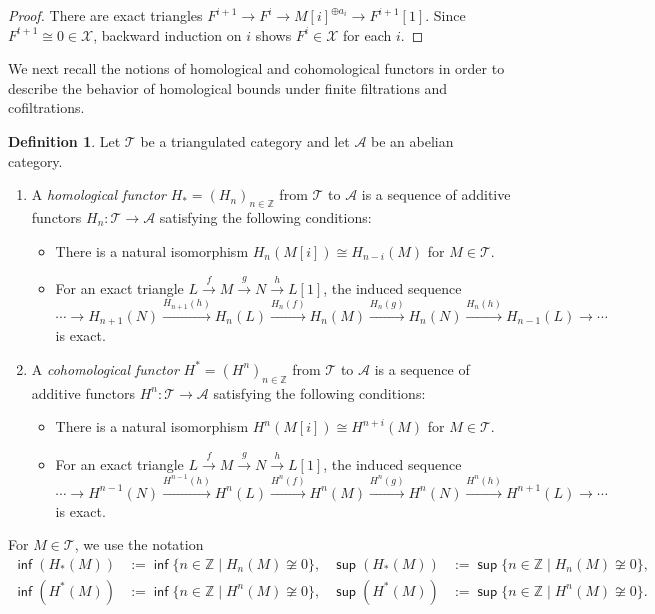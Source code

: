 \documentclass[10pt, a4paper,reqno]{amsart}
\theoremstyle{definition}
\newtheorem{dfn}[dfn]{Definition}
\theoremstyle{remark}
\numberwithin{equation}{thm}
\def\ZZ{\mathbb{Z}}
\def\cA{\mathcal{A}}
\def\cT{\mathcal{T}}
\def\cX{\mathcal{X}}
\def\sup{\operatorname{\mathsf{sup}}}
\def\inf{\operatorname{\mathsf{inf}}}
\begin{document}
\begin{proof}
There are exact triangles $F^{i+1} \to F^i \to M[i]^{\oplus a_i} \to F^{i+1}[1]$.
Since $F^{t+1} \cong 0 \in \cX$, backward induction on $i$ shows $F^i \in \cX$ for each $i$. 
\end{proof}


We next recall the notions of homological and cohomological functors in order to describe the behavior of homological bounds under finite filtrations and cofiltrations.

\begin{dfn}
Let $\cT$ be a triangulated category and let $\cA$ be an abelian category.
\begin{enumerate}[\rm(1)]
\item
A {\em homological functor}	$H_* = (H_n)_{n \in \ZZ}$ from $\cT$ to $\cA$ is a sequence of additive functors $H_n: \cT \to \cA$ satisfying the following conditions:
\begin{itemize}
\item
There is a natural isomorphism $H_{n}(M[i]) \cong H_{n-i}(M)$ for $M \in \cT$.
\item
For an exact triangle $L \xrightarrow{f} M \xrightarrow{g} N \xrightarrow{h} L[1]$, the induced sequence
\[
\cdots \to H_{n+1}(N) \xrightarrow{H_{n+1}(h)} H_n(L) \xrightarrow{H_{n}(f)} H_n(M) \xrightarrow{H_{n}(g)}  H_n(N) \xrightarrow{H_{n}(h)} H_{n-1}(L) \to \cdots 
\]
is exact.	
\end{itemize}

\item
A {\em cohomological functor} $H^* = (H^n)_{n \in \ZZ}$ from $\cT$ to $\cA$ is a sequence of additive functors $H^n: \cT \to \cA$ satisfying the following conditions:
\begin{itemize}
\item
There is a natural isomorphism $H^{n}(M[i]) \cong H^{n+i}(M)$ for $M \in \cT$.
\item
For an exact triangle $L \xrightarrow{f} M \xrightarrow{g} N \xrightarrow{h} L[1]$, the induced sequence
\[
\cdots \to H^{n-1}(N) \xrightarrow{H^{n-1}(h)} H^n(L) \xrightarrow{H^{n}(f)} H^n(M) \xrightarrow{H^{n}(g)}  H^n(N) \xrightarrow{H^{n}(h)} H^{n+1}(L) \to \cdots 
\]
is exact.	
\end{itemize}
\end{enumerate}
For $M\in\cT$, we use the notation
\[
\begin{aligned}
\inf (H_*(M)) &:=\inf\{n\in\ZZ\mid H_n(M)\not\cong0\},&
\sup (H_*(M)) &:=\sup\{n\in\ZZ\mid H_n(M)\not\cong0\},\\
\inf (H^*(M)) &:=\inf\{n\in\ZZ\mid H^n(M)\not\cong0\},&
\sup (H^*(M)) &:=\sup\{n\in\ZZ\mid H^n(M)\not\cong0\}.
\end{aligned}
\]
\end{dfn}
\end{document}

